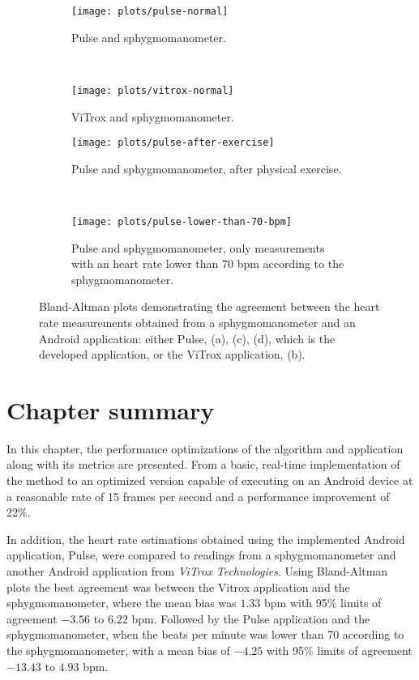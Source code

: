 \begin{figure}[p]
  \begin{subfigure}{0.5\textwidth}
    \texttt{[image: plots/pulse-normal]}
    \caption{Pulse and sphygmomanometer.}
    \label{fig:plots:heart:pulse:normal}
  \end{subfigure}
  ~
  \begin{subfigure}{0.5\textwidth}
    \texttt{[image: plots/vitrox-normal]}
    \caption{ViTrox and sphygmomanometer.}
    \label{fig:plots:heart:vitrox:normal}
  \end{subfigure}

  \begin{subfigure}{0.5\textwidth}
    \texttt{[image: plots/pulse-after-exercise]}
    \caption{Pulse and sphygmomanometer, after physical exercise.}
    \label{fig:plots:heart:pulse:exercise}
  \end{subfigure}
  ~
  \begin{subfigure}{0.5\textwidth}
    \texttt{[image: plots/pulse-lower-than-70-bpm]}
    \caption{
      Pulse and sphygmomanometer, only measurements with an heart rate lower
      than 70 bpm according to the sphygmomanometer.
    }
    \label{fig:plots:heart:pulse:low}
  \end{subfigure}

  \caption{
    Bland-Altman plots demonstrating the agreement between the heart rate
    measurements obtained from a sphygmomanometer and an Android application:
    either Pulse, (a), (c), (d), which is the developed application,
    or the ViTrox application, (b).
  }
  \label{fig:plots:heart}
\end{figure}

\section{Chapter summary}

In this chapter, the performance optimizations of the algorithm and application
along with its metrics are presented. From a basic, real-time
implementation of the \evm{} method to an optimized version capable of
executing on an Android device at a reasonable rate of 15 frames per second
and a performance improvement of 22\%.

In addition, the heart rate estimations obtained using the
implemented Android application, Pulse, were compared to readings
from a sphygmomanometer and another Android application from
\emph{ViTrox Technologies}. Using Bland-Altman plots the best agreement
was between the Vitrox application and the sphygmomanometer, where the mean
bias was $1.33$ bpm with 95\% limits of agreement $-3.56$ to $6.22$ bpm.
Followed by the Pulse application and the sphygmomanometer, when the
beats per minute was lower than 70 according to the sphygmomanometer, with a
mean bias of $-4.25$ with 95\% limits of agreement $-13.43$ to $4.93$ bpm.
